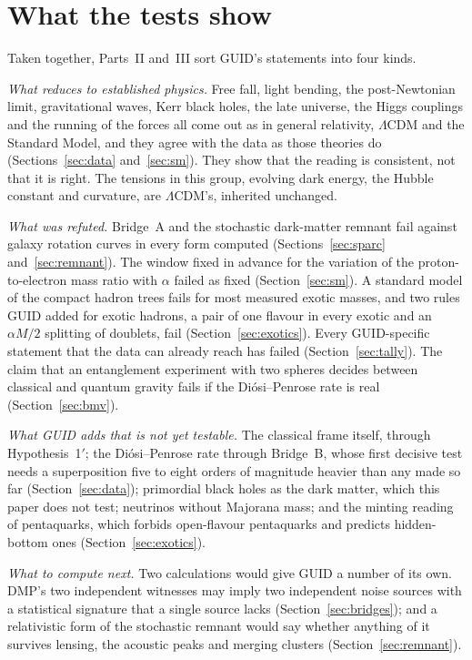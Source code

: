 \section{What the tests show}\label{sec:synthesis}

Taken together, Parts~II and~III sort GUID's statements into four kinds.

\emph{What reduces to established physics.} Free fall, light bending, the post-Newtonian limit, gravitational waves, Kerr black holes, the
late universe, the Higgs couplings and the running of the forces all come out as in general relativity, $\Lambda$CDM and the Standard
Model, and they agree with the data as those theories do (Sections~\ref{sec:data} and~\ref{sec:sm}). They show that the reading is
consistent, not that it is right. The tensions in this group, evolving dark energy, the Hubble constant and curvature, are $\Lambda$CDM's,
inherited unchanged.

\emph{What was refuted.} Bridge~A and the stochastic dark-matter remnant fail against galaxy rotation curves in every form computed
(Sections~\ref{sec:sparc} and~\ref{sec:remnant}). The window fixed in advance for the variation of the proton-to-electron mass ratio with
$\alpha$ failed as fixed (Section~\ref{sec:sm}). A standard model of the compact hadron trees fails for most measured exotic masses, and
two rules GUID added for exotic hadrons, a pair of one flavour in every exotic and an $\alpha M/2$ splitting of doublets, fail
(Section~\ref{sec:exotics}). Every GUID-specific statement that the data can already reach has failed (Section~\ref{sec:tally}). The claim that an entanglement experiment with two spheres decides between classical and quantum gravity
fails if the Di\'osi--Penrose rate is real (Section~\ref{sec:bmv}).

\emph{What GUID adds that is not yet testable.} The classical frame itself, through Hypothesis~1$'$; the Di\'osi--Penrose rate through
Bridge~B, whose first decisive test needs a superposition five to eight orders of magnitude heavier than any made so far
(Section~\ref{sec:data}); primordial black holes as the dark matter, which this paper does not test; neutrinos without Majorana mass; and
the minting reading of pentaquarks, which forbids open-flavour pentaquarks and predicts hidden-bottom ones (Section~\ref{sec:exotics}).

\emph{What to compute next.} Two calculations would give GUID a number of its own. DMP's two independent witnesses may imply two
independent noise sources with a statistical signature that a single source lacks (Section~\ref{sec:bridges}); and a relativistic form of
the stochastic remnant would say whether anything of it survives lensing, the acoustic peaks and merging clusters
(Section~\ref{sec:remnant}).

